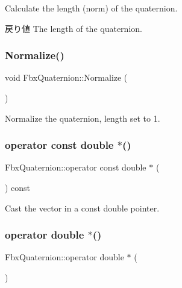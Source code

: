 Calculate the length (norm) of the quaternion. \begin{DoxyReturn}{戻り値}
The length of the quaternion. 
\end{DoxyReturn}
\mbox{\label{class_fbx_quaternion_a8f7c3917fe374a2b836d58dbc23098f7}} 
\subsubsection{\texorpdfstring{Normalize()}{Normalize()}}
{\footnotesize\ttfamily void Fbx\+Quaternion\+::\+Normalize (\begin{DoxyParamCaption}{ }\end{DoxyParamCaption})}

Normalize the quaternion, length set to 1. \mbox{\label{class_fbx_quaternion_a0ff9bd06a5800ce91388eb185cdd8dc8}} 
\subsubsection{\texorpdfstring{operator const double $\ast$()}{operator const double *()}}
{\footnotesize\ttfamily Fbx\+Quaternion\+::operator const double $\ast$ (\begin{DoxyParamCaption}{ }\end{DoxyParamCaption}) const}



Cast the vector in a const double pointer. 

\mbox{\label{class_fbx_quaternion_a6cef0915096bd157458f8fd02aa3e904}} 
\subsubsection{\texorpdfstring{operator double $\ast$()}{operator double *()}}
{\footnotesize\ttfamily Fbx\+Quaternion\+::operator double $\ast$ (\begin{DoxyParamCaption}{ }\end{DoxyParamCaption})}



